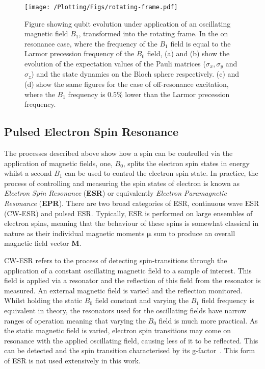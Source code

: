 \begin{figure}
  \centering
  \texttt{[image: /Plotting/Figs/rotating-frame.pdf]}
  \caption[Qubit evolution under a an oscillating magnetic field in the rotating frame]{Figure showing qubit evolution under application of an oscillating magnetic field $B_1$, transformed into the rotating frame. In the on resonance case, where the frequency of the $B_1$ field is equal to the Larmor precession frequency of the $B_0$ field, (a) and (b) show the evolution of the expectation values of the Pauli matrices ($\sigma_x, \sigma_y$ and $\sigma_z$) and the state dynamics on the Bloch sphere respectively. (c) and (d) show the same figures for the case of off-resonance excitation, where the $B_1$ frequency is $0.5\%$ lower than the Larmor precession frequency.}
  \label{fig:rabi-dynamics}
\end{figure}

\subsection{Pulsed Electron Spin Resonance}
The processes described above show how a spin can be controlled via the application of magnetic fields, one, $B_0$, splits the electron spin states in energy whilst a second $B_1$ can be used to control the electron spin state. In practice, the process of controlling and measuring the spin states of electron is known as \emph{Electron Spin Resonance} (\textbf{ESR}) or equivalently \emph{Electron Paramagnetic Resonance} (\textbf{EPR}). There are two broad categories of ESR, continuous wave ESR (CW-ESR) and pulsed ESR. Typically, ESR is performed on large ensembles of electron spins, meaning that the behaviour of these spins is somewhat classical in nature as their individual magnetic moments $\mathbf{\mu}$ sum to produce an overall magnetic field vector $\mathbf{M}$.

CW-ESR refers to the process of detecting spin-transitions through the application of a constant oscillating magnetic field to a sample of interest. This field is applied via a resonator and the reflection of this field from the resonator is measured. An external magnetic field is varied and the reflection monitored. Whilst holding the static $B_0$ field constant and varying the $B_1$ field frequency is equivalent in theory, the resonators used for the oscillating fields have narrow ranges of operation meaning that varying the $B_0$ field is much more practical. As the static magnetic field is varied, electron spin transitions may come on resonance with the applied oscillating field, causing less of it to be reflected. This can be detected and the spin transition characterised by its g-factor~\cite{Gere1959,Feher1959}. This form of ESR is not used extensively in this work.

